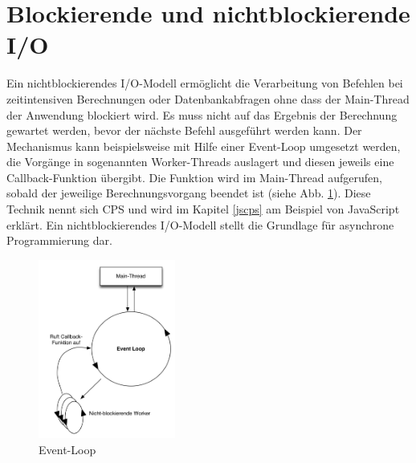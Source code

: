 \section{Blockierende und nichtblockierende \acs{I/O}}
 \label{sec:nonblocking}Ein nichtblockierendes I/O-Modell ermöglicht die Verarbeitung von Befehlen bei zeitintensiven Berechnungen oder Datenbankabfragen ohne dass der Main-Thread der Anwendung blockiert wird. Es muss nicht auf das Ergebnis der Berechnung gewartet werden, bevor der nächste Befehl ausgeführt werden kann. Der Mechanismus kann beispielsweise mit Hilfe einer Event-Loop umgesetzt werden, die Vorgänge in sogenannten Worker-Threads auslagert und diesen jeweils eine Callback-Funktion übergibt. Die Funktion wird im Main-Thread aufgerufen, sobald der jeweilige Berechnungsvorgang beendet ist (siehe Abb. \ref{fig:nonblocking}). Diese Technik nennt sich \acf{CPS} und wird im Kapitel \ref{jscps} am Beispiel von JavaScript erklärt. Ein nichtblockierendes I/O-Modell stellt die Grundlage für asynchrone Programmierung dar.
\begin{figure}[H]
\centering
\includegraphics[width=0.4\textwidth]{images/nonblocking.png}
\caption[Event-Loop]{Event-Loop}
\label{fig:nonblocking}
\end{figure}
\acresetall
